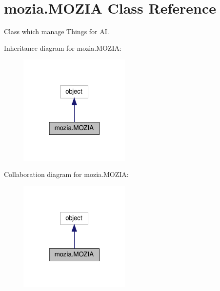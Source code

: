 \hypertarget{classmozia_1_1MOZIA}{}\section{mozia.\+M\+O\+Z\+IA Class Reference}
\label{classmozia_1_1MOZIA}


Class which manage Things for AI.  




Inheritance diagram for mozia.\+M\+O\+Z\+IA\+:\nopagebreak
\begin{figure}[H]
\begin{center}
\leavevmode
\includegraphics[width=157pt]{classmozia_1_1MOZIA__inherit__graph}
\end{center}
\end{figure}


Collaboration diagram for mozia.\+M\+O\+Z\+IA\+:\nopagebreak
\begin{figure}[H]
\begin{center}
\leavevmode
\includegraphics[width=157pt]{classmozia_1_1MOZIA__coll__graph}
\end{center}
\end{figure}

